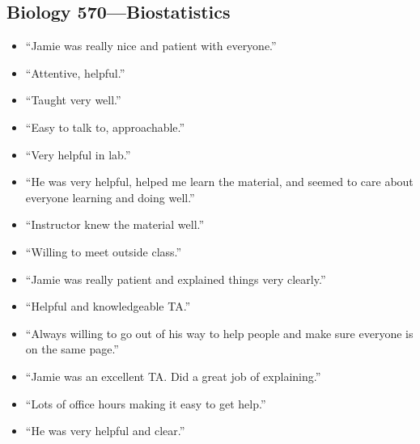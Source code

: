 \documentclass[10pt]{article}
\newenvironment{myItemize}{
  \begin{itemize}
    \setlength{\leftskip}{-4mm}
    \setlength{\itemsep}{0.25em}
    \setlength{\parskip}{0pt}
    \setlength{\parsep}{0.5em}}
  {\end{itemize}}
\begin{document}
\begin{multicols}{2}
\subsection*{Biology 570---Biostatistics}
\begin{myItemize}
\sffamily
\item ``Jamie was really nice and patient with everyone.''
\item ``Attentive, helpful.''
\item ``Taught very well.''
\item ``Easy to talk to, approachable.''
\item ``Very helpful in lab.''
\item ``He was very helpful, helped me learn the material, and seemed to care
about everyone learning and doing well.''
\item ``Instructor knew the material well.''
\item ``Willing to meet outside class.''
\item ``Jamie was really patient and explained things very clearly.''
\item ``Helpful and knowledgeable TA.''
\item ``Always willing to go out of his way to help people and make sure
everyone is on the same page.''
\item ``Jamie was an excellent TA. Did a great job of explaining.''
\item ``Lots of office hours making it easy to get help.''
\item ``He was very helpful and clear.''
\end{myItemize}
\end{multicols}
\end{document}
